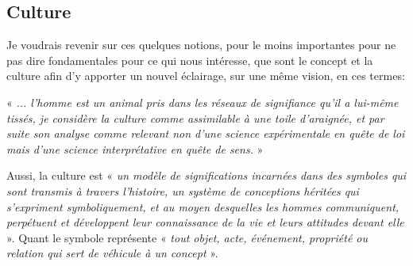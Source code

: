 \documentclass{article}
\begin{document}

\subsection{Culture} 

Je voudrais revenir sur ces quelques notions, pour le moins importantes pour ne pas dire fondamentales pour ce qui nous intéresse, que sont le concept et la culture afin d'y apporter un nouvel éclairage, sur une même vision, en ces termes:

 « \textit{... l’homme est un animal pris dans les réseaux de signifiance qu’il a lui-même tissés, je considère la culture comme assimilable à une toile d’araignée, et par suite son analyse comme relevant non d’une science expérimentale en quête de loi mais d’une science interprétative en quête de sens.} »

Aussi, la culture est « \textit{un modèle de significations incarnées dans des symboles qui sont transmis à travers l'histoire, un système de conceptions héritées qui s'expriment symboliquement, et au moyen desquelles les hommes communiquent, perpétuent et développent leur connaissance de la vie et leurs attitudes devant elle} ». Quant le symbole représente « \textit{tout objet, acte, événement, propriété ou relation qui sert de véhicule à un concept} ».

%

\bigskip
\end{document}
